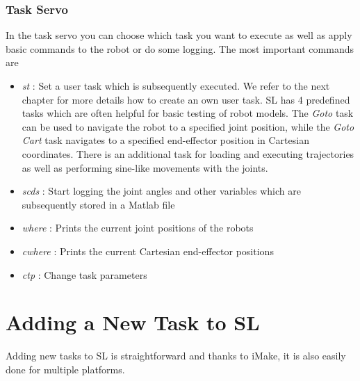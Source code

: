 \documentclass[11pt, article, colorback]{article}
\begin{document}
\subsubsection*{Task Servo}
In the task servo you can choose which task you want to execute as well as apply basic commands to the robot or do some logging. The most important commands are
\begin{itemize}
  \item {\em st} : Set a user task which is subsequently executed. We refer to the next chapter for more details how to create an own user task. SL has 4 predefined tasks which are often
helpful for basic testing of robot models. The {\em Goto} task can be used to navigate the robot to a specified joint position, while the {\em Goto Cart} task navigates to a specified end-effector position in Cartesian coordinates. There is an additional 
task for loading and executing trajectories as well as performing sine-like movements with the joints. 
  \item {\em scds} : Start logging the joint angles and other variables which are subsequently stored in a Matlab file
  \item {\em where} : Prints the current joint positions of the robots
  \item {\em cwhere} : Prints the current Cartesian end-effector positions
  \item {\em ctp} : Change task parameters
\end{itemize}



\section{Adding a New Task to SL} 
Adding new tasks to SL is straightforward and thanks to iMake, it is also easily done for multiple platforms.
\end{document}
